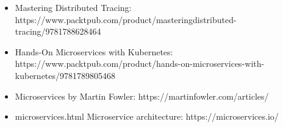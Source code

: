 

\begin{itemize}
\item 
Mastering Distributed Tracing: https://www.packtpub.com/product/masteringdistributed-tracing/9781788628464

\item 
Hands-On Microservices with Kubernetes: https://www.packtpub.com/product/hands-on-microservices-with-kubernetes/9781789805468

\item 
Microservices by Martin Fowler: https://martinfowler.com/articles/

\item 
microservices.html Microservice architecture: https://microservices.io/
\end{itemize}
